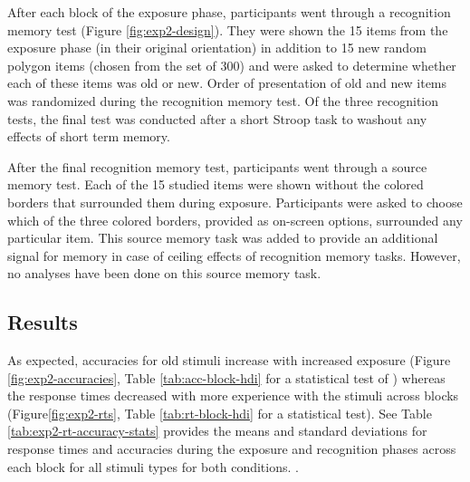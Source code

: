 After each block of the exposure phase, participants went through a recognition memory test (Figure \ref{fig:exp2-design}). They were shown the 15  items from the exposure phase (in their original orientation) in addition to 15 new random polygon items (chosen from the set of 300) and were asked to determine whether each of these items was old or new. Order of presentation of old and new items was randomized during the recognition memory test. Of the three recognition tests, the final test was conducted after a short Stroop task to washout any effects of short term memory. 

After the final recognition memory test, participants went through a source memory test. Each of the 15 studied items were shown without the colored borders that surrounded them during exposure. Participants were asked to choose which of the three colored borders, provided as on-screen options, surrounded any particular item. This source memory task was added to provide an additional signal for memory in case of ceiling effects of recognition memory tasks. However, no analyses have been done on this source memory task. 


\subsection{Results}

As expected, accuracies for old stimuli increase with increased exposure (Figure \ref{fig:exp2-accuracies}, Table \ref{tab:acc-block-hdi} for a statistical test of ) whereas the response times decreased with more experience with the stimuli across blocks (Figure\ref{fig:exp2-rts}, Table \ref{tab:rt-block-hdi} for a statistical test). See Table \ref{tab:exp2-rt-accuracy-stats} provides the means and standard deviations for response times and accuracies \ac{during the exposure and recognition phases} across each block for all stimuli types for both conditions. . 

